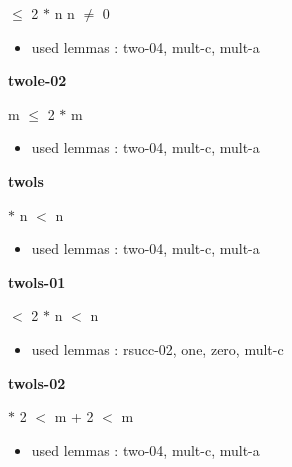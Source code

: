 \documentclass[a4paper]{article}
\begin{document}
\medskip

  $\le$ 2 $*$ n \Equiv n $\neq$ 0

\begin{itemize}


\item       used lemmas  : two-04, mult-c, mult-a

\end{itemize}

\medskip

\bigskip

{\large\bf twole-02}

\medskip

 \Fol m $\le$ 2 $*$ m

\begin{itemize}


\item       used lemmas  : two-04, mult-c, mult-a

\end{itemize}

\medskip

\bigskip

{\large\bf twols}

\medskip

 \Fol {} $*$ n $<$ n

\begin{itemize}


\item       used lemmas  : two-04, mult-c, mult-a

\end{itemize}

\medskip

\bigskip

{\large\bf twols-01}

\medskip

  $<$ 2 $*$ n  $<$ n

\begin{itemize}


\item       used lemmas  : rsucc-02, one, zero, mult-c

\end{itemize}

\medskip

\bigskip

{\large\bf twols-02}

\medskip

  $*$ 2 $<$ m + 2  $<$ m

\begin{itemize}


\item       used lemmas  : two-04, mult-c, mult-a

\end{itemize}
\end{document}
